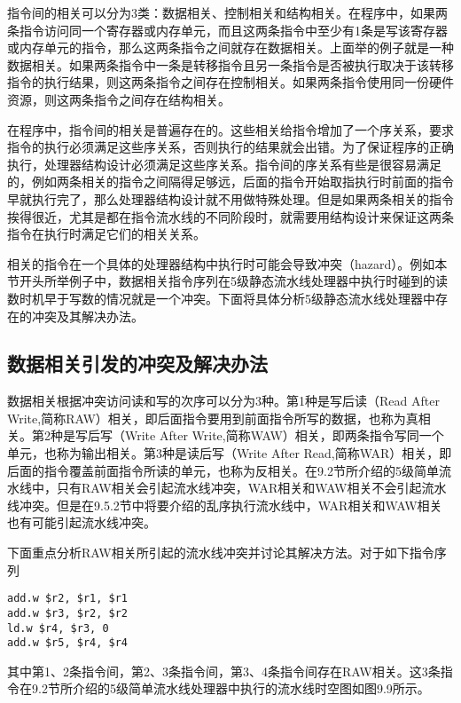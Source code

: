 \documentclass[]{ctexbook}
\begin{document}
指令间的相关可以分为3类：数据相关、控制相关和结构相关。在程序中，如果两条指令访问同一个寄存器或内存单元，而且这两条指令中至少有1条是写该寄存器或内存单元的指令，那么这两条指令之间就存在数据相关。上面举的例子就是一种数据相关。如果两条指令中一条是转移指令且另一条指令是否被执行取决于该转移指令的执行结果，则这两条指令之间存在控制相关。如果两条指令使用同一份硬件资源，则这两条指令之间存在结构相关。

在程序中，指令间的相关是普遍存在的。这些相关给指令增加了一个序关系，要求指令的执行必须满足这些序关系，否则执行的结果就会出错。为了保证程序的正确执行，处理器结构设计必须满足这些序关系。指令间的序关系有些是很容易满足的，例如两条相关的指令之间隔得足够远，后面的指令开始取指执行时前面的指令早就执行完了，那么处理器结构设计就不用做特殊处理。但是如果两条相关的指令挨得很近，尤其是都在指令流水线的不同阶段时，就需要用结构设计来保证这两条指令在执行时满足它们的相关关系。

相关的指令在一个具体的处理器结构中执行时可能会导致冲突（hazard）。例如本节开头所举例子中，数据相关指令序列在5级静态流水线处理器中执行时碰到的读数时机早于写数的情况就是一个冲突。下面将具体分析5级静态流水线处理器中存在的冲突及其解决办法。

\hypertarget{ux6570ux636eux76f8ux5173ux5f15ux53d1ux7684ux51b2ux7a81ux53caux89e3ux51b3ux529eux6cd5}{%
\subsection{数据相关引发的冲突及解决办法}\label{ux6570ux636eux76f8ux5173ux5f15ux53d1ux7684ux51b2ux7a81ux53caux89e3ux51b3ux529eux6cd5}}

数据相关根据冲突访问读和写的次序可以分为3种。第1种是写后读（Read After Write,简称RAW）相关，即后面指令要用到前面指令所写的数据，也称为真相关。第2种是写后写（Write After Write,简称WAW）相关，即两条指令写同一个单元，也称为输出相关。第3种是读后写（Write After Read,简称WAR）相关，即后面的指令覆盖前面指令所读的单元，也称为反相关。在9.2节所介绍的5级简单流水线中，只有RAW相关会引起流水线冲突，WAR相关和WAW相关不会引起流水线冲突。但是在9.5.2节中将要介绍的乱序执行流水线中，WAR相关和WAW相关也有可能引起流水线冲突。

下面重点分析RAW相关所引起的流水线冲突并讨论其解决方法。对于如下指令序列

\begin{verbatim}
add.w $r2, $r1, $r1
add.w $r3, $r2, $r2
ld.w $r4, $r3, 0
add.w $r5, $r4, $r4
\end{verbatim}

其中第1、2条指令间，第2、3条指令间，第3、4条指令间存在RAW相关。这3条指令在9.2节所介绍的5级简单流水线处理器中执行的流水线时空图如图9.9所示。
\end{document}
